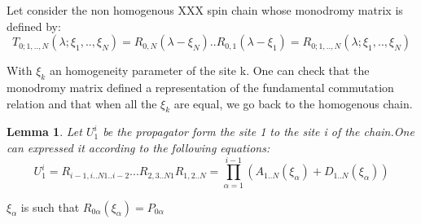 \documentclass[12pt]{article}
\newtheorem{lemma}{Lemma}[section]
\begin{document}
Let consider the non homogenous XXX spin chain whose monodromy matrix is defined by:
\begin{equation}
T_{0;1,..,N}(\lambda;\xi_{1},..,\xi_{N})=R_{0,N}(\lambda-\xi_{N})..R_{0,1}(\lambda-\xi_{1})=R_{0;1,..,N}(\lambda;\xi_{1},..,\xi_{N})
\end{equation}

With $\xi_{k}$ an homogeneity parameter of the site k. One can check that the monodromy matrix defined a representation of the fundamental commutation relation and that when all the  $\xi_{k}$ are equal, we go back to the homogenous chain.
\begin{lemma}

Let $U_{1}^{i}$ be the propagator form the site 1 to the site i of the chain.One can expressed it according to the following equations:
\begin{equation}
U_{1}^{i}=R_{i-1,i..N1..i-2} . . . R_{2,3..N1}R_{1,2..N}=\prod_{\alpha=1}^{i-1}(A_{1..N}(\xi_{\alpha})+D_{1..N}(\xi_{\alpha}))
\end{equation}
\end{lemma}

$\xi_{\alpha}$ is such that $R_{0\alpha}(\xi_{\alpha})=P_{0\alpha}$
\end{document}
